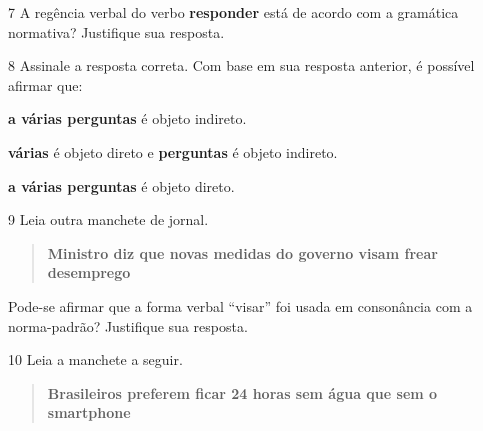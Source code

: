 \num{7} A regência verbal do verbo \textbf{responder} está de acordo com
a gramática normativa? Justifique sua resposta.


\num{8} Assinale a resposta correta. Com base em sua resposta anterior,
é possível afirmar que:

\begin{boxlist}
 \textbf{a várias perguntas} é objeto indireto.

 \textbf{várias} é objeto direto e \textbf{perguntas} é objeto indireto.

 \textbf{a várias perguntas} é objeto direto.
\end{boxlist}

\num{9} Leia outra manchete de jornal.

\begin{quote}
\textbf{Ministro diz que novas medidas do governo visam frear desemprego}

\end{quote}

Pode-se afirmar que a forma verbal ``visar'' foi usada em consonância
com a norma-padrão? Justifique sua resposta.


\pagebreak
\num{10} Leia a manchete a seguir.

\begin{quote}
\textbf{Brasileiros preferem ficar 24 horas sem água que sem o smartphone}


\end{quote}

